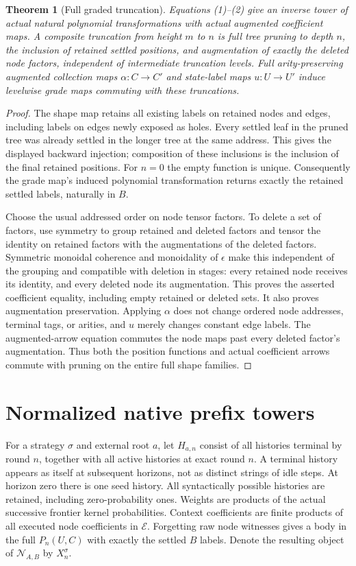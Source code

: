 \documentclass[11pt]{article}
\newtheorem{theorem}{Theorem}\newtheorem{proposition}[theorem]{Proposition}
\newcommand{\E}{\mathcal E}
\begin{document}
\begin{theorem}[Full graded truncation]
Equations (1)--(2) give an inverse tower of actual natural polynomial transformations with actual augmented coefficient maps. A composite truncation from height $m$ to $n$ is full tree pruning to depth $n$, the inclusion of retained settled positions, and augmentation of exactly the deleted node factors, independent of intermediate truncation levels. Full arity-preserving augmented collection maps $\alpha:C\to C'$ and state-label maps $u:U\to U'$ induce levelwise grade maps commuting with these truncations.
\end{theorem}
\begin{proof}
The shape map retains all existing labels on retained nodes and edges, including labels on edges newly exposed as holes. Every settled leaf in the pruned tree was already settled in the longer tree at the same address. This gives the displayed backward injection; composition of these inclusions is the inclusion of the final retained positions. For $n=0$ the empty function is unique. Consequently the grade map's induced polynomial transformation returns exactly the retained settled labels, naturally in $B$.

Choose the usual addressed order on node tensor factors. To delete a set of factors, use symmetry to group retained and deleted factors and tensor the identity on retained factors with the augmentations of the deleted factors. Symmetric monoidal coherence and monoidality of $\epsilon$ make this independent of the grouping and compatible with deletion in stages: every retained node receives its identity, and every deleted node its augmentation. This proves the asserted coefficient equality, including empty retained or deleted sets. It also proves augmentation preservation. Applying $\alpha$ does not change ordered node addresses, terminal tags, or arities, and $u$ merely changes constant edge labels. The augmented-arrow equation commutes the node maps past every deleted factor's augmentation. Thus both the position functions and actual coefficient arrows commute with pruning on the entire full shape families.
\end{proof}

\section{Normalized native prefix towers}
For a strategy $\sigma$ and external root $a$, let $H_{a,n}$ consist of all histories terminal by round $n$, together with all active histories at exact round $n$. A terminal history appears as itself at subsequent horizons, not as distinct strings of idle steps. At horizon zero there is one seed history. All syntactically possible histories are retained, including zero-probability ones. Weights are products of the actual successive frontier kernel probabilities. Context coefficients are finite products of all executed node coefficients in $\E$. Forgetting raw node witnesses gives a body in the full $P_n(U,C)$ with exactly the settled $B$ labels. Denote the resulting object of $\mathcal N_{A,B}$ by $X_n^\sigma$.
\end{document}

